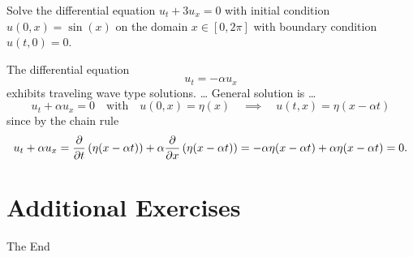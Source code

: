 \begin{problem}
    Solve the differential equation $u_t + 3u_x=0$ with initial condition $u(0,x) = \sin(x)$
    on the domain $x \in [0,2\pi]$ with boundary condition $u(t,0) = 0$.
\end{problem}
\solution{
    \[ u(t,x) = \sin(x-3t) \]
}

The differential equation
\[ u_{t} = -\alpha u_{x} \]
exhibits traveling wave type solutions.
\ldots
General solution is \ldots
\[ u_t + \alpha u_x = 0 \quad \text{with} \quad u(0,x) = \eta(x) \quad \implies \quad
    u(t,x) = \eta(x-\alpha t) \]
since by the chain rule 
\[ u_t + \alpha u_x = \frac{\partial  }{\partial t} \left( \eta(x-\alpha t) \right) + \alpha \frac{\partial  }{\partial x} \left(
    \eta(x-\alpha t) \right)=
    -\alpha \eta(x-\alpha t) + \alpha \eta(x-\alpha t) = 0. \]

\section{Additional Exercises}

\newpage
\begin{center}
    {\LARGE The End}
\end{center}
\newpage



